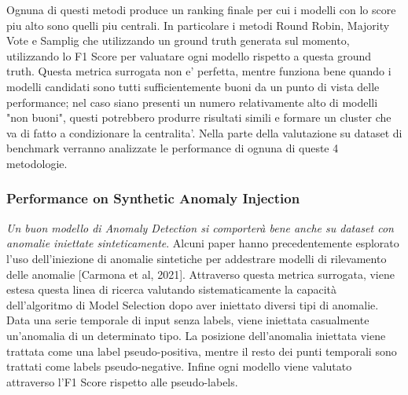 Ognuna di questi metodi produce un ranking finale per cui i modelli con lo score piu alto sono quelli piu centrali. In particolare i metodi Round Robin, Majority Vote e Samplig che utilizzando un ground truth generata sul momento, utilizzando lo F1 Score per valuatare ogni modello rispetto a questa ground truth.
Questa metrica surrogata non e' perfetta, mentre funziona bene quando i modelli candidati sono tutti sufficientemente buoni da un punto di vista delle performance; nel caso siano presenti un numero relativamente alto di modelli "non buoni", questi potrebbero produrre risultati simili e formare un cluster che va di fatto a condizionare la centralita'.
Nella parte della valutazione su dataset di benchmark verranno analizzate le performance di ognuna di queste 4 metodologie.


\subsubsection{Performance on Synthetic Anomaly Injection}
\textit{Un buon modello di Anomaly Detection si comporterà bene anche su dataset con anomalie iniettate sinteticamente}. Alcuni paper hanno precedentemente esplorato l'uso dell'iniezione di anomalie sintetiche per addestrare
modelli di rilevamento delle anomalie [Carmona et al,
2021]. Attraverso questa metrica surrogata, viene estesa questa linea di ricerca
valutando sistematicamente la capacità dell'algoritmo di Model Selection dopo aver iniettato diversi tipi di anomalie. Data una serie temporale di input senza labels, viene iniettata casualmente un'anomalia di un determinato tipo. La posizione dell'anomalia iniettata viene trattata come una label pseudo-positiva, mentre il resto dei punti temporali sono trattati come labels pseudo-negative. 
Infine ogni modello viene valutato attraverso l'F1 Score rispetto alle pseudo-labels.


